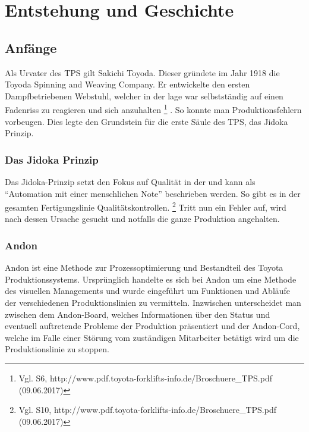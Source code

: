 \documentclass[00_ToyotaProduktionssystem.tex]{subfiles}
\begin{document}
\chapter{Entstehung und Geschichte}
\label{chap:ENTSTEHUNG}
\section{Anfänge}
Als Urvater des TPS gilt Sakichi Toyoda. Dieser gründete im Jahr 1918 die Toyoda Spinning and Weaving Company. Er entwickelte den ersten Dampfbetriebenen Webstuhl, welcher in der lage war selbstständig auf einen Fadenriss zu reagieren und sich anzuhalten
\footnote{Vgl. S6,  http://www.pdf.toyota-forklifts-info.de/Broschuere\_TPS.pdf (09.06.2017)}
. So konnte man Produktionsfehlern vorbeugen. Dies legte den Grundstein für die erste Säule des TPS, das Jidoka Prinzip.
\subsection{Das Jidoka Prinzip}
Das Jidoka-Prinzip setzt den Fokus auf Qualität in der  und kann als “Automation mit einer menschlichen Note” beschrieben werden. So gibt es in der gesamten Fertigungslinie Qualitätskontrollen. 
\footnote{Vgl. S10,  http://www.pdf.toyota-forklifts-info.de/Broschuere\_TPS.pdf (09.06.2017)}
 Tritt nun ein Fehler auf, wird nach dessen Ursache gesucht und notfalls die ganze Produktion angehalten.
\subsection{Andon}
Andon ist eine Methode zur Prozessoptimierung und Bestandteil des Toyota Produktionssystems. Ursprünglich handelte es sich bei Andon um eine Methode des visuellen Managements und wurde eingeführt um Funktionen und Abläufe der verschiedenen Produktionslinien zu vermitteln. Inzwischen unterscheidet man zwischen dem Andon-Board, welches Informationen über den Status und eventuell auftretende Probleme der Produktion präsentiert und der Andon-Cord, welche im Falle einer Störung vom zuständigen Mitarbeiter betätigt wird um die Produktionslinie zu stoppen.
\end{document}
